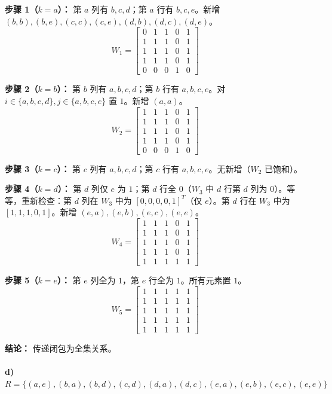 \documentclass[11pt,UTF8]{article}
\begin{document}
\textbf{步骤 1（$k=a$）：} 第 $a$ 列有 $b,c,d$；第 $a$ 行有 $b,c,e$。新增 $(b,b),(b,e),(c,c),(c,e),(d,b),(d,c),(d,e)$。
\[
W_1 = \begin{bmatrix}
0 & 1 & 1 & 0 & 1 \\
1 & 1 & 1 & 0 & 1 \\
1 & 1 & 1 & 0 & 1 \\
1 & 1 & 1 & 0 & 1 \\
0 & 0 & 0 & 1 & 0
\end{bmatrix}
\]

\textbf{步骤 2（$k=b$）：} 第 $b$ 列有 $a,b,c,d$；第 $b$ 行有 $a,b,c,e$。对 $i\in\{a,b,c,d\},j\in\{a,b,c,e\}$ 置 $1$。新增 $(a,a)$。
\[
W_2 = \begin{bmatrix}
1 & 1 & 1 & 0 & 1 \\
1 & 1 & 1 & 0 & 1 \\
1 & 1 & 1 & 0 & 1 \\
1 & 1 & 1 & 0 & 1 \\
0 & 0 & 0 & 1 & 0
\end{bmatrix}
\]

\textbf{步骤 3（$k=c$）：} 第 $c$ 列有 $a,b,c,d$；第 $c$ 行有 $a,b,c,e$。无新增（$W_2$ 已饱和）。

\textbf{步骤 4（$k=d$）：} 第 $d$ 列仅 $e$ 为 $1$；第 $d$ 行全 $0$（$W_3$ 中 $d$ 行第 $d$ 列为 $0$）。等等，重新检查：第 $d$ 列在 $W_3$ 中为 $[0,0,0,0,1]^T$（仅 $e$）。第 $d$ 行在 $W_3$ 中为 $[1,1,1,0,1]$。新增 $(e,a),(e,b),(e,c),(e,e)$。
\[
W_4 = \begin{bmatrix}
1 & 1 & 1 & 0 & 1 \\
1 & 1 & 1 & 0 & 1 \\
1 & 1 & 1 & 0 & 1 \\
1 & 1 & 1 & 0 & 1 \\
1 & 1 & 1 & 1 & 1
\end{bmatrix}
\]

\textbf{步骤 5（$k=e$）：} 第 $e$ 列全为 $1$，第 $e$ 行全为 $1$。所有元素置 $1$。
\[
W_5 = \begin{bmatrix}
1 & 1 & 1 & 1 & 1 \\
1 & 1 & 1 & 1 & 1 \\
1 & 1 & 1 & 1 & 1 \\
1 & 1 & 1 & 1 & 1 \\
1 & 1 & 1 & 1 & 1
\end{bmatrix}
\]

\textbf{结论：} 传递闭包为全集关系。

\paragraph{d) $R = \{(a,e),(b,a),(b,d),(c,d),(d,a),(d,c),(e,a),(e,b),(e,c),(e,e)\}$}
\end{document}
